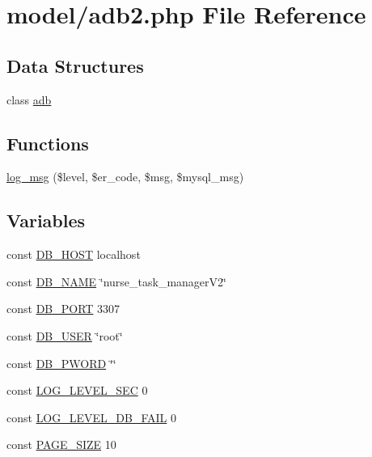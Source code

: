 \hypertarget{adb2_8php}{}\section{model/adb2.php File Reference}
\label{adb2_8php}
\subsection*{Data Structures}
\begin{DoxyCompactItemize}
\item 
class \hyperlink{classadb}{adb}
\end{DoxyCompactItemize}
\subsection*{Functions}
\begin{DoxyCompactItemize}
\item 
\hyperlink{adb2_8php_a1e25554d72181a453541a67aacceb663}{log\+\_\+msg} (\$level, \$er\+\_\+code, \$msg, \$mysql\+\_\+msg)
\end{DoxyCompactItemize}
\subsection*{Variables}
\begin{DoxyCompactItemize}
\item 
const \hyperlink{adb2_8php_a293363d7988627f671958e2d908c202a}{D\+B\+\_\+\+H\+O\+S\+T} \textquotesingle{}localhost\textquotesingle{}
\item 
const \hyperlink{adb2_8php_ab5db0d3504f917f268614c50b02c53e2}{D\+B\+\_\+\+N\+A\+M\+E} \char`\"{}nurse\+\_\+task\+\_\+manager\+V2\char`\"{}
\item 
const \hyperlink{adb2_8php_a5a1723fe7208eb06dad75185af8c3f06}{D\+B\+\_\+\+P\+O\+R\+T} 3307
\item 
const \hyperlink{adb2_8php_a1d1d99f8e08f387d84fe9848f3357156}{D\+B\+\_\+\+U\+S\+E\+R} \char`\"{}root\char`\"{}
\item 
const \hyperlink{adb2_8php_a83045a6202d81e1bd45c5bf19773579a}{D\+B\+\_\+\+P\+W\+O\+R\+D} \char`\"{}\char`\"{}
\item 
const \hyperlink{adb2_8php_a335d166b8615583931d3ff798c6e2fb1}{L\+O\+G\+\_\+\+L\+E\+V\+E\+L\+\_\+\+S\+E\+C} 0
\item 
const \hyperlink{adb2_8php_a44b26ee05d02c7acb05e8b44bbfe4a76}{L\+O\+G\+\_\+\+L\+E\+V\+E\+L\+\_\+\+D\+B\+\_\+\+F\+A\+I\+L} 0
\item 
const \hyperlink{adb2_8php_a4634a091c35db33009455321e1d259e3}{P\+A\+G\+E\+\_\+\+S\+I\+Z\+E} 10
\end{DoxyCompactItemize}


